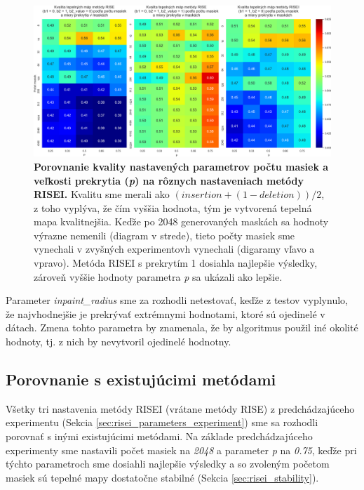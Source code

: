 \begin{figure}
    \centering
    \includegraphics[width=20.6cm]{assets/images/risei_parameters.png}
    \caption{\textbf{Porovnanie kvality nastavených parametrov počtu masiek a veľkosti prekrytia (\textit{p}) na rôznych nastaveniach metódy RISEI.} Kvalitu sme merali ako $(insertion + (1 - deletion)) / 2$, z toho vyplýva, že čím vyššia hodnota, tým je vytvorená tepelná mapa kvalitnejšia. Keďže po 2048 generovaných maskách sa hodnoty výrazne nemenili (diagram v strede), tieto počty masiek sme vynechali v zvyšných experimentovh vynechali (digaramy vľavo a vpravo). Metóda RISEI s prekrytím 1 dosiahla najlepšie výsledky, zároveň vyššie hodnoty parametra \textit{p} sa ukázali ako lepšie.}
    \label{fig:risei_parameters}
\end{figure}

Parameter \textit{inpaint\_radius} sme za rozhodli netestovať, keďže z testov vyplynulo, že najvhodnejšie je prekrývať extrémnymi hodnotami, ktoré sú ojedinelé v dátach. Zmena tohto parametra by znamenala, že by algoritmus použil iné okolité hodnoty, tj. z nich by nevytvoril ojedinelé hodnotny.

\subsection{Porovnanie s existujúcimi metódami}

Všetky tri nastavenia metódy RISEI (vrátane metódy RISE) z predchádzajúceho experimentu (Sekcia \ref{sec:risei_parameters_experiment}) sme sa rozhodli porovnať s inými existujúcimi metódami. Na základe predchádzajúceho experimenty sme nastavili počet masiek na \textit{2048} a parameter \textit{p} na \textit{0.75}, keďže pri týchto parametroch sme dosiahli najlepšie výsledky a so zvoleným početom masiek sú tepelné mapy dostatočne stabilné (Sekcia \ref{sec:risei_stability}).

